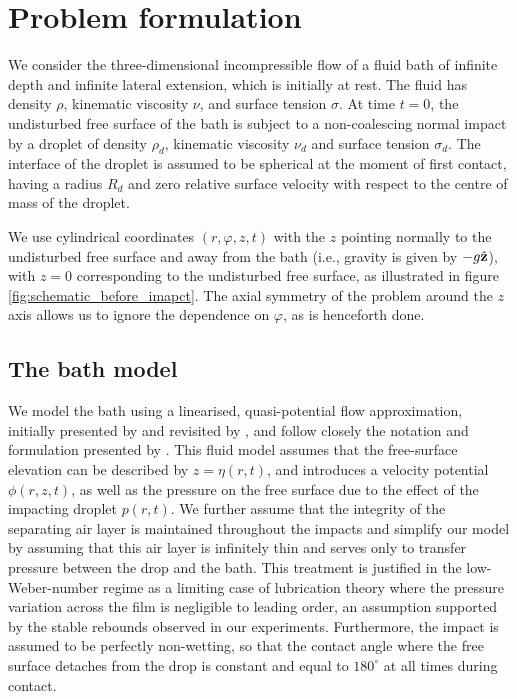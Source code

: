 \documentclass{jfm}
\begin{document}
\section{Problem formulation}\label{sec:Problem_formulation}

 We consider the three-dimensional incompressible flow of a fluid bath of infinite depth and infinite lateral extension, which is initially at rest. The fluid has density $\rho$, kinematic viscosity $\nu$, and surface tension $\sigma$. At time $t=0$, the undisturbed free surface of the bath is subject to a non-coalescing normal impact by a droplet of density $\rho_d$, kinematic viscosity $\nu_d$ and surface tension $\sigma_d$. The interface of the droplet is assumed to be spherical at the moment of first contact, having a radius $R_d$ and zero relative surface velocity with respect to the centre of mass of the droplet. 
 
 We use cylindrical coordinates $(r,\varphi,z,t)$ with the $z$ pointing normally to the undisturbed free surface and away from the bath (i.e., gravity is given by $-g\hat{\bf{z}}$), with $z = 0$ corresponding to the undisturbed free surface, as illustrated in figure 
\ref{fig:schematic_before_imapct}. The axial symmetry of the problem around the $z$ axis allows us to ignore the dependence on $\varphi$, as is henceforth done.

 \subsection{The bath model}
 We model the bath using a linearised, quasi-potential flow approximation, initially presented by \cite{Lamb} and revisited by \cite{DiasEtAl2008}, and follow closely the notation and formulation presented by \cite{GaleanoRiosEtAl2017}. This fluid model assumes that the free-surface elevation can be described by $z = \eta(r, t)$, and introduces a velocity potential $\phi(r, z, t)$, as well as the pressure on the free surface due to the effect of the impacting droplet $p(r, t)$. We further assume that the integrity of the separating air layer is maintained throughout the impacts and simplify our model by assuming that this air layer is infinitely thin and serves only to transfer pressure between the drop and the bath. This treatment is justified in the low-Weber-number regime as a limiting case of lubrication theory where the pressure variation across the film is negligible to leading order, an assumption supported by the stable rebounds observed in our experiments. Furthermore, the impact is assumed to be perfectly non-wetting, so that the contact angle where the free surface detaches from the drop is constant and equal to $180^\circ$ at all times during contact.
 
\end{document}
